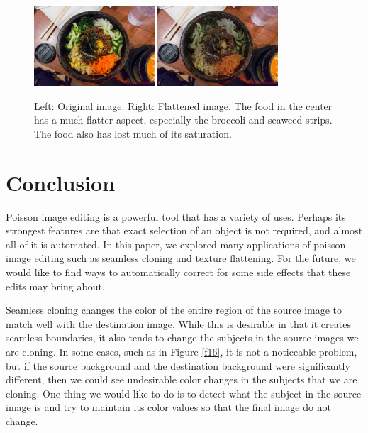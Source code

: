 \documentclass[12pt]{article}
\begin{document}
\noindent\begin{figure}[H]
\centering
\includegraphics[width=0.4\textwidth,keepaspectratio]{data/TextureFlattening/food/food.jpg}
\includegraphics[width=0.4\textwidth,keepaspectratio]{data/TextureFlattening/food/texture_flatten.jpg}
\caption{Left: Original image. Right: Flattened image. The food in the center has a much flatter aspect, especially the broccoli and seaweed strips. The food also has lost much of its saturation.}
\label{child}
\end{figure}
\section{Conclusion}
Poisson image editing is a powerful tool that has a variety of uses. Perhaps its strongest features are that exact selection of an object is not required, and almost all of it is automated. In this paper, we explored many applications of poisson image editing such as seamless cloning and texture flattening. For the future, we would like to find ways to automatically correct for some side effects that these edits may bring about.

Seamless cloning changes the color of the entire region of the source image to match well with the destination image. While this is desirable in that it creates seamless boundaries, it also tends to change the subjects in the source images we are cloning. In some cases, such as in Figure \ref{f16}, it is not a noticeable problem, but if the source background and the destination background were significantly different, then we could see undesirable color changes in the subjects that we are cloning. One thing we would like to do is to detect what the subject in the source image is and try to maintain its color values so that the final image do not change.
\end{document}
